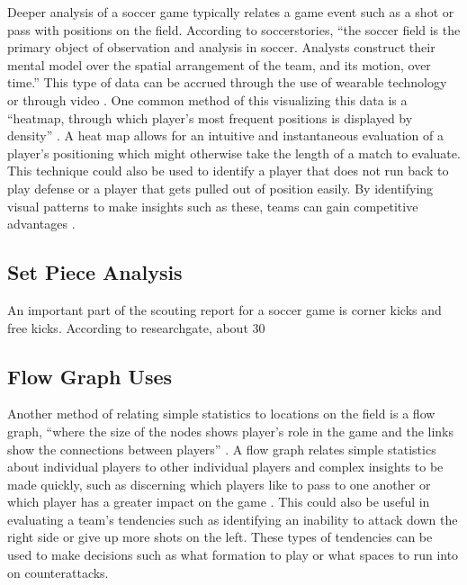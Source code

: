 \documentclass[sigconf]{acmart}
\begin{document}
Deeper analysis of a soccer game typically relates a game event such as a shot or pass with positions on the field. According to soccerstories, “the soccer field is the primary object of observation and analysis in soccer. Analysts construct their mental model over the spatial arrangement of the team, and its motion, over time.”\cite{SoccerStories} This type of data can be accrued through the use of wearable technology or through video \cite{SoccerStories}. One common method of this visualizing this data is a “heatmap, through which player's most frequent positions is displayed by density” \cite{SoccerStories}. A heat map allows for an intuitive and instantaneous evaluation of a player’s positioning which might otherwise take the length of a match to evaluate. This technique could also be used to identify a player that does not run back to play defense or a player that gets pulled out of position easily. By identifying visual patterns to make insights such as these, teams can gain competitive advantages \cite{SoccerStories}.

\subsection{Set Piece Analysis}

An important part of the scouting report for a soccer game is corner kicks and free kicks. According to researchgate,  about 30%

\subsection{Flow Graph Uses}

Another method of relating simple statistics to locations on the field is a flow graph, “where the size of the nodes shows player's role in the game and the links show the connections between players” \cite{SoccerStories}. A flow graph relates simple statistics about individual players to other individual players and complex insights to be made quickly, such as discerning which players like to pass to one another or which player has a greater impact on the game \cite{SoccerStories}. This could also be useful in evaluating a team’s tendencies such as identifying an inability to attack down the right side or give up more shots on the left. These types of tendencies can be used to make decisions such as what formation to play or what spaces to run into on counterattacks.
\end{document}
